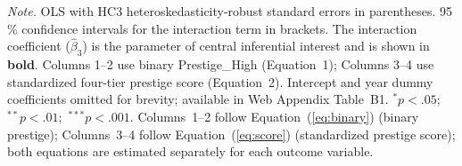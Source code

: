 \documentclass[12pt,a4paper]{article}
\begin{document}
\begin{table}[htbp]
\begin{threeparttable}
\begin{tabular}{lcccc}
\bottomrule
\end{tabular}
\begin{tablenotes}
\footnotesize
\item \textit{Note.} OLS with HC3 heteroskedasticity-robust standard errors
  in parentheses. 95\,\% confidence intervals for the interaction term in
  brackets. The interaction coefficient ($\hat{\beta}_3$) is the parameter of
  central inferential interest and is shown in \textbf{bold}.
  Columns 1--2 use binary Prestige\_High (Equation~1);
  Columns 3--4 use standardized four-tier prestige score (Equation~2).
  Intercept and year dummy coefficients omitted for brevity; available in
  Web Appendix Table~B1.
  $^{*}p<.05$;\ $^{**}p<.01$;\ $^{***}p<.001$.
  Columns~1--2 follow Equation~(\ref{eq:binary}) (binary prestige);
  Columns~3--4 follow Equation~(\ref{eq:score}) (standardized
  prestige score); both equations are estimated separately for
  each outcome variable.
\end{tablenotes}
\end{threeparttable}
\end{table}

\newpage
\end{document}
